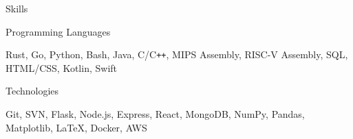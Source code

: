 \documentclass{resume}
\begin{document}
\begin{rSection}{\large Skills}
\begin{rSubsection}{Programming Languages}{}{}{}
\item Rust, Go, Python, Bash, Java, C/C{}\verb!++!, MIPS Assembly, RISC-V Assembly, SQL, HTML/CSS, Kotlin, Swift 
\end{rSubsection}

\begin{rSubsection}{Technologies}{}{}{}
\item Git, SVN, Flask, Node.js, Express, React, MongoDB, NumPy, Pandas, Matplotlib, LaTeX, Docker, AWS
\end{rSubsection}


\end{rSection}
\end{document}
